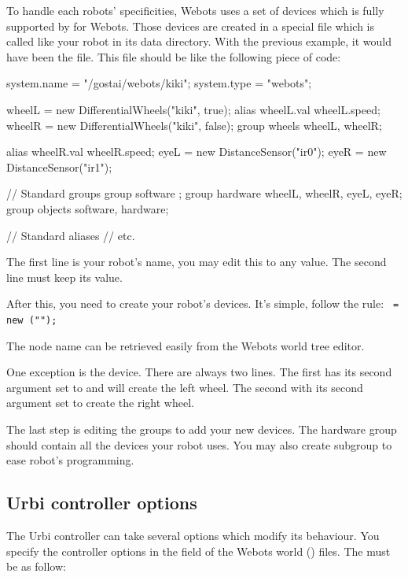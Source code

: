 To handle each robots' specificities, Webots uses a set of devices
which is fully supported by \urbi for Webots. Those devices are
created in a special file which is called like your robot in its data
directory.  With the previous example, it would have been the
 file. This file should be like the following
piece of code:

\begin{urbifixme}
system.name = "/gostai/webots/kiki";
system.type = "webots";


wheelL = new DifferentialWheels("kiki", true);
alias wheelL.val wheelL.speed;
wheelR = new DifferentialWheels("kiki", false);
group wheels {wheelL, wheelR};

alias wheelR.val wheelR.speed;
eyeL = new DistanceSensor("ir0");
eyeR = new DistanceSensor("ir1");

// Standard groups
group software {};
group hardware {wheelL, wheelR, eyeL, eyeR};
group objects {software, hardware};

// Standard aliases
// etc.
\end{urbifixme}

The first line is your robot's name, you may edit this to any value.
The second line must keep its value.

After this, you need to create your robot's devices. It's simple,
follow the rule: \texttt{ = new
  (""); }

The node name can be retrieved easily from the Webots world tree
editor.

One exception is the  device.  There are
always two lines. The first has its second argument set to 
and will create the left wheel. The second with its second argument
set to  create the right wheel.

The last step is editing the groups to add your new devices. The
hardware group should contain all the devices your robot uses. You may
also create subgroup to ease robot's programming.


\subsection{Urbi controller options}

The Urbi controller can take several options which modify its
behaviour.  You specify the controller options in the
 field of the Webots world () files.
The  must be as follow:

